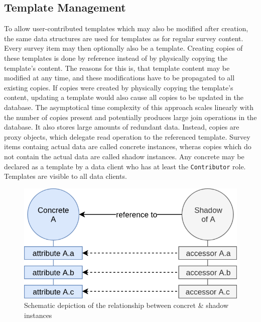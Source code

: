 \documentclass[a4paper,11pt]{article}
\def\inline{\lstinline[basicstyle=\ttfamily,keywordstyle={}]}
\begin{document}
            \subsection{Template Management}
                To allow user-contributed templates which may also be modified after
                creation, the same data structures are used for templates as for
                regular survey content. Every survey item may then optionally also
                be a template. Creating copies of these templates is done by
                reference instead of by physically copying the template's content.
                The reasons for this is, that template content may be modified
                at any time, and these modifications have to be propagated to
                all existing copies. If copies were created by physically
                copying the template's content, updating a template would
                also cause all copies to be updated in the database. The
                asymptotical time complexity of this approach scales linearly
                with the number of copies present and potentially produces
                large join operations in the database. It also stores
                large amounts of redundant data. Instead, copies are
                proxy objects, which delegate read operation to the referenced
                template. Survey items containg actual data are called
                concrete instances, wheras copies which do not contain
                the actual data are called shadow instances.
                Any concrete may be declared as a template by a data client
                who has at least the \inline{Contributor} role.
                Templates are visible to all data clients.

                \begin{figure}
                    \centering
                    \includegraphics[width=.48\textwidth]{shadow-concept}
                    \caption{Schematic depiction of the relationship between concret \& shadow instances}
                    \label{fig:shadow-concept}
                \end{figure}
\end{document}
